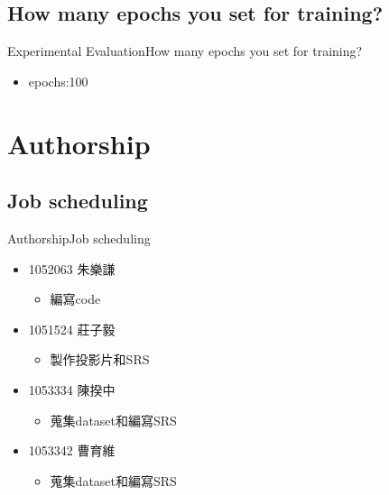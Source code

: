 \documentclass{beamer}
\begin{document}
\begin{CJK*}{UTF8}{bsmi}
\subsection*{How many epochs you set for training?}
\begin{frame}{Experimental Evaluation}{How many epochs you set for training?}
  \begin{itemize}
  \item {
  epochs:100
  }
  \end{itemize}
\end{frame}

\section*{Authorship}
\subsection*{Job scheduling}
\begin{frame}{Authorship}{Job scheduling}
  \begin{itemize}
  \item {
    1052063 朱樂謙
  }
   \begin{itemize}
   \item 編寫code\\[0.5cm]
   \end{itemize}
  \item {
    1051524 莊子毅
  }
   \begin{itemize}
   \item 製作投影片和SRS\\[0.5cm]
   \end{itemize}
  \item {
    1053334 陳揆中
  }
   \begin{itemize}
   \item 蒐集dataset和編寫SRS\\[0.5cm]
   \end{itemize}
  \item {
    1053342 曹育維
  }
   \begin{itemize}
   \item 蒐集dataset和編寫SRS\\[0.5cm]
   \end{itemize}
  \end{itemize}
\end{frame}





\end{CJK*}
\end{document}
